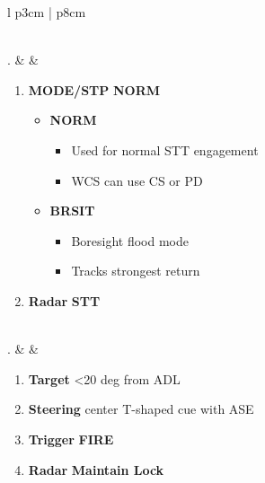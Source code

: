 \documentclass[8pt,usenames,dvipsnames,twoside]{article}
\begin{document}
\begin{center}
\begin{tabular}{l p{3cm} | p{8cm}}
\begin{minipage}[t]{\linewidth}
\begin{enumerate}[label=(\alph*)]
\begin{itemize}
						\end{itemize}
					\end{enumerate}
				\end{minipage} \\
				. &  & 
				\begin{minipage}[t]{\linewidth}
					\vspace{-7pt}
					\begin{enumerate}[label=(\alph*)]
						\item \textbf{MODE/STP} \dotfill \textbf{NORM}
						\begin{itemize}
							\item \textbf{NORM}
							\begin{itemize}
								\item Used for normal STT engagement
								\item WCS can use CS or PD
							\end{itemize}
							\item \textbf{BRSIT}
							\begin{itemize}
								\item Boresight flood mode
								\item Tracks strongest return
							\end{itemize}
						\end{itemize}
						\item \textbf{Radar} \dotfill \textbf{STT}
					\end{enumerate}
				\end{minipage} \\
				. &  & 
				\begin{minipage}[t]{\linewidth}
					\vspace{-7pt}
					\begin{enumerate}[label=(\alph*)]
						\item \textbf{Target} \dotfill <20 deg from ADL
						\item \textbf{Steering} \dotfill center T-shaped cue with ASE
						\item \textbf{Trigger} \dotfill \textbf{FIRE}
						\item \textbf{Radar} \dotfill \textbf{Maintain Lock}
					\end{enumerate}
				\end{minipage} \\
				\bottomrule
			\end{tabular}
		\end{center}
		
\end{document}
